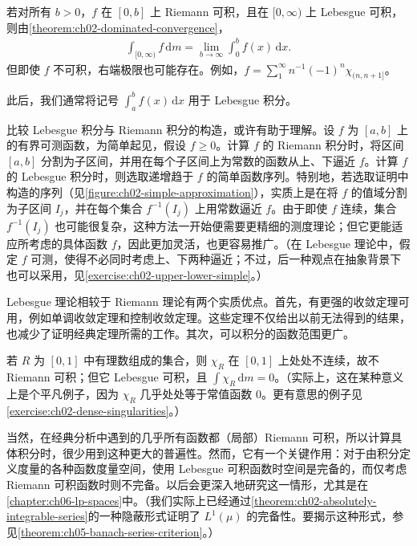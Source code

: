 \documentclass[../../main.tex]{subfiles}%
\begin{document}
\begin{example}\label{example:ch02-improper-integral}
若对所有 $b>0$，$f$ 在 $[0,b]$ 上 Riemann 可积，且在 $[0,\infty)$ 上 Lebesgue 可积，则由\cref{theorem:ch02-dominated-convergence}，
\begin{align*}
\int_{[0,\infty)}f\,\mathrm{d}m=\lim_{b\to\infty}\int_0^b f(x)\,\mathrm{d}x.
\end{align*}
但即使 $f$ 不可积，右端极限也可能存在。例如，$f=\sum_1^\infty n^{-1}(-1)^n\chi_{(n,n+1]}$。
\end{example}
此后，我们通常将记号 $\int_a^b f(x)\,\mathrm{d}x$ 用于 Lebesgue 积分。
\begin{remark}
比较 Lebesgue 积分与 Riemann 积分的构造，或许有助于理解。设 $f$ 为 $[a,b]$ 上的有界可测函数，为简单起见，假设 $f\ge0$。计算 $f$ 的 Riemann 积分时，将区间 $[a,b]$ 分割为子区间，并用在每个子区间上为常数的函数从上、下逼近 $f$。计算 $f$ 的 Lebesgue 积分时，则选取递增趋于 $f$ 的简单函数序列。特别地，若选取证明中构造的序列（见\cref{figure:ch02-simple-approximation}），实质上是在将 $f$ 的值域分割为子区间 $I_j$，并在每个集合 $f^{-1}(I_j)$ 上用常数逼近 $f$。由于即使 $f$ 连续，集合 $f^{-1}(I_j)$ 也可能很复杂，这种方法一开始便需要更精细的测度理论；但它更能适应所考虑的具体函数 $f$，因此更加灵活，也更容易推广。（在 Lebesgue 理论中，假定 $f$ 可测，使得不必同时考虑上、下两种逼近；不过，后一种观点在抽象背景下也可以采用，见\cref{exercise:ch02-upper-lower-simple}。）
\end{remark}
Lebesgue 理论相较于 Riemann 理论有两个实质优点。首先，有更强的收敛定理可用，例如单调收敛定理和控制收敛定理。这些定理不仅给出以前无法得到的结果，也减少了证明经典定理所需的工作。其次，可以积分的函数范围更广。
\begin{example}\label{example:ch02-rational-indicator}
若 $R$ 为 $[0,1]$ 中有理数组成的集合，则 $\chi_R$ 在 $[0,1]$ 上处处不连续，故不 Riemann 可积；但它 Lebesgue 可积，且 $\int\chi_R\,\mathrm{d}m=0$。（实际上，这在某种意义上是个平凡例子，因为 $\chi_R$ 几乎处处等于常值函数 $0$。更有意思的例子见\cref{exercise:ch02-dense-singularities}。）
\end{example}
当然，在经典分析中遇到的几乎所有函数都（局部）Riemann 可积，所以计算具体积分时，很少用到这种更大的普遍性。然而，它有一个关键作用：对于由积分定义度量的各种函数度量空间，使用 Lebesgue 可积函数时空间是完备的，而仅考虑 Riemann 可积函数时则不完备。以后会更深入地研究这一情形，尤其是在\cref{chapter:ch06-lp-spaces}中。（我们实际上已经通过\cref{theorem:ch02-absolutely-integrable-series}的一种隐蔽形式证明了 $L^1(\mu)$ 的完备性。要揭示这种形式，参见\cref{theorem:ch05-banach-series-criterion}。）
\end{document}
